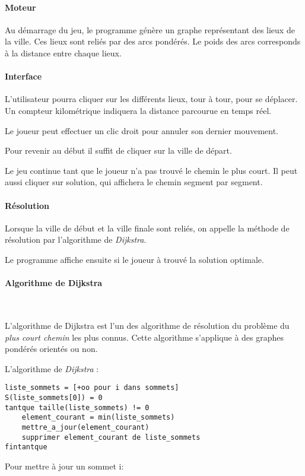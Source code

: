         \paragraph{Moteur}
            Au démarrage du jeu, le programme génère un graphe
            représentant des lieux de la ville. Ces lieux sont reliés par des arcs pondérés.
            Le poids des arcs corresponds à la distance entre chaque lieux.

        \paragraph{Interface}

        L'utilisateur pourra cliquer sur les différents lieux, tour à tour,
        pour se déplacer. Un compteur kilométrique indiquera la
        distance parcourue en temps réel.

        Le joueur peut effectuer un clic droit pour annuler son dernier
        mouvement.

        Pour revenir au début il suffit de cliquer sur la ville de départ.

        Le jeu continue tant que le joueur n'a pas trouvé le chemin
        le plus court. Il peut aussi cliquer sur \og solution\fg, qui
        affichera le chemin segment par segment.

        \paragraph{Résolution}
            Lorsque la ville de début et la ville finale sont reliés,
            on appelle la méthode de résolution par l'algorithme de \emph{Dijkstra}.

            Le programme affiche ensuite si le joueur à trouvé la solution optimale.

		\paragraph{Algorithme de Dijkstra} ~

			L'algorithme de Dijkstra est l'un des algorithme de résolution du problème du
			\emph{plus court chemin} les plus connus. Cette algorithme s'applique à des graphes pondérés orientés ou non.

			L'algorithme de \emph{Dijkstra} :
			\begin{lstlisting}
liste_sommets = [+oo pour i dans sommets]
S(liste_sommets[0]) = 0
tantque taille(liste_sommets) != 0
    element_courant = min(liste_sommets)
    mettre_a_jour(element_courant)
    supprimer element_courant de liste_sommets
fintantque
			\end{lstlisting}
			Pour mettre à jour un sommet i:

